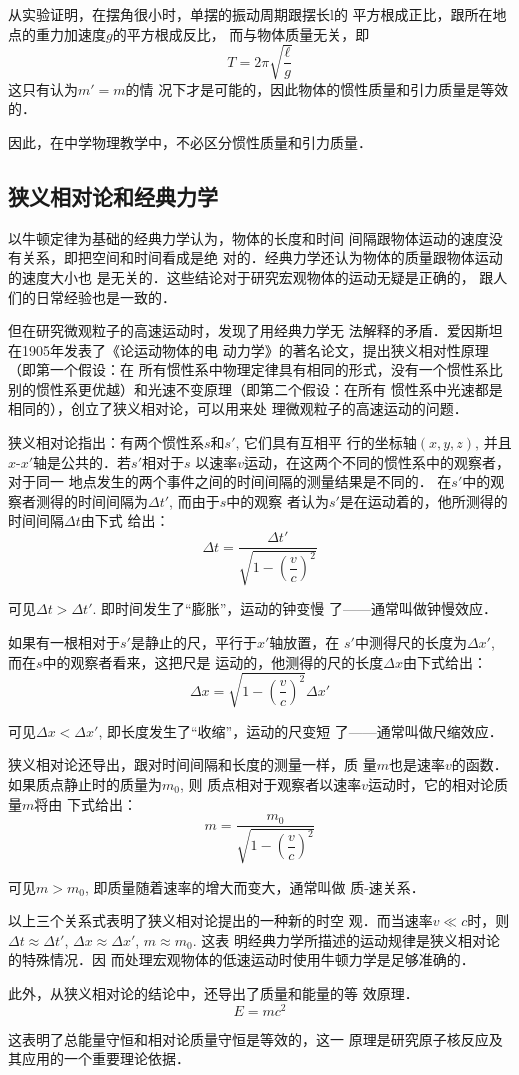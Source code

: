 从实验证明，在摆角很小时，单摆的振动周期跟摆长l的
平方根成正比，跟所在地点的重力加速度$g$的平方根成反比，
而与物体质量无关，即
$$T=2\pi\sqrt{\frac{\ell}{g}}$$
这只有认为$m'=m$的情
况下才是可能的，因此物体的惯性质量和引力质量是等效的．

因此，在中学物理教学中，不必区分惯性质量和引力质量．


\subsection{狭义相对论和经典力学}
以牛顿定律为基础的经典力学认为，物体的长度和时间
间隔跟物体运动的速度没有关系，即把空间和时间看成是绝
对的．经典力学还认为物体的质量跟物体运动的速度大小也
是无关的．这些结论对于研究宏观物体的运动无疑是正确的，
跟人们的日常经验也是一致的．

但在研究微观粒子的高速运动时，发现了用经典力学无
法解释的矛盾．爱因斯坦在1905年发表了《论运动物体的电
动力学》的著名论文，提出狭义相对性原理（即第一个假设：在
所有惯性系中物理定律具有相同的形式，没有一个惯性系比
别的惯性系更优越）和光速不变原理（即第二个假设：在所有
惯性系中光速都是相同的），创立了狭义相对论，可以用来处
理微观粒子的高速运动的问题．

狭义相对论指出：有两个惯性系$s$和$s'$, 它们具有互相平
行的坐标轴$(x,y,z)$, 并且$x$-$x'$轴是公共的．若$s'$相对于$s$
以速率$v$运动，在这两个不同的惯性系中的观察者，对于同一
地点发生的两个事件之间的时间间隔的测量结果是不同的．
在$s'$中的观察者测得的时间间隔为$\Delta t'$, 而由于$s$中的观察
者认为$s'$是在运动着的，他所测得的时间间隔$\Delta t$由下式
给出：
\[\Delta t=\frac{\Delta t'}{\sqrt{1-\left(\dfrac{v}{c}\right)^2}}\]

可见$\Delta t>\Delta t'$. 即时间发生了“膨胀”，运动的钟变慢
了——通常叫做钟慢效应．

如果有一根相对于$s'$是静止的尺，平行于$x'$轴放置，在
$s'$中测得尺的长度为$\Delta x'$, 而在$s$中的观察者看来，这把尺是
运动的，他测得的尺的长度$\Delta x$由下式给出：
\[\Delta x={\sqrt{1-\left(\dfrac{v}{c}\right)^2}}\Delta x'\]

可见$\Delta x<\Delta x'$, 即长度发生了“收缩”，运动的尺变短
了——通常叫做尺缩效应．

狭义相对论还导出，跟对时间间隔和长度的测量一样，质
量$m$也是速率$v$的函数．如果质点静止时的质量为$m_0$, 则
质点相对于观察者以速率$v$运动时，它的相对论质量$m$将由
下式给出：
\[m=\frac{m_0}{\sqrt{1-\left(\dfrac{v}{c}\right)^2}}\]

可见$m>m_0$, 即质量随着速率的增大而变大，通常叫做
质-速关系．

以上三个关系式表明了狭义相对论提出的一种新的时空
观．而当速率$v\ll c$时，则$\Delta t\approx \Delta t'$, $\Delta x\approx \Delta x'$, $m\approx m_0$. 这表
明经典力学所描述的运动规律是狭义相对论的特殊情况．因
而处理宏观物体的低速运动时使用牛顿力学是足够准确的．

此外，从狭义相对论的结论中，还导出了质量和能量的等
效原理．
\[E=mc^2\]

这表明了总能量守恒和相对论质量守恒是等效的，这一
原理是研究原子核反应及其应用的一个重要理论依据．
